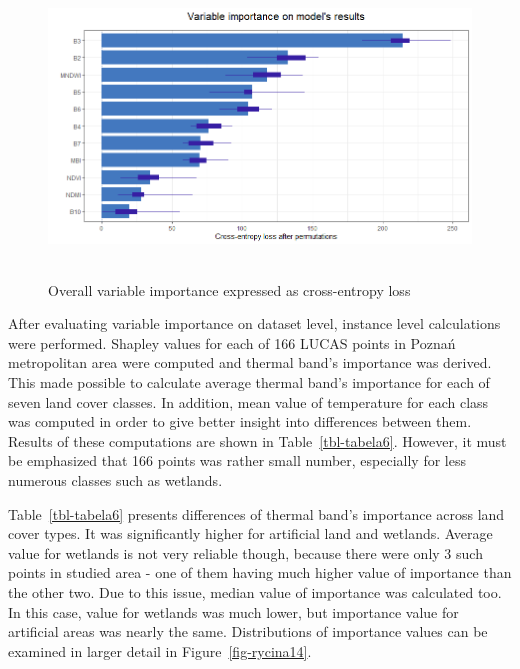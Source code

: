 \documentclass{amuthesis}
\begin{document}
\begin{figure}[H]

{\centering \includegraphics[width=5.625in,height=3.125in]{./figures/importance.png}

}

\caption{\label{fig-rycina13}Overall variable importance expressed as
cross-entropy loss}

\end{figure}

After evaluating variable importance on dataset level, instance level
calculations were performed. Shapley values for each of 166 LUCAS points
in Poznań metropolitan area were computed and thermal band's importance
was derived. This made possible to calculate average thermal band's
importance for each of seven land cover classes. In addition, mean value
of temperature for each class was computed in order to give better
insight into differences between them. Results of these computations are
shown in Table~\ref{tbl-tabela6}. However, it must be emphasized that
166 points was rather small number, especially for less numerous classes
such as wetlands.

Table~\ref{tbl-tabela6} presents differences of thermal band's
importance across land cover types. It was significantly higher for
artificial land and wetlands. Average value for wetlands is not very
reliable though, because there were only 3 such points in studied area -
one of them having much higher value of importance than the other two.
Due to this issue, median value of importance was calculated too. In
this case, value for wetlands was much lower, but importance value for
artificial areas was nearly the same. Distributions of importance values
can be examined in larger detail in Figure~\ref{fig-rycina14}.
\end{document}
